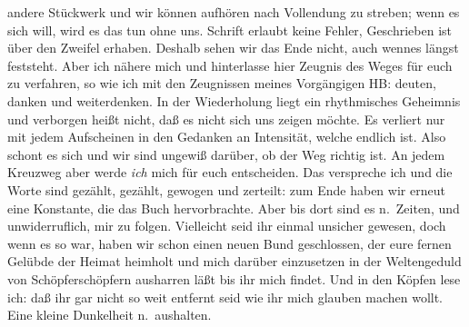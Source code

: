 \documentclass[
]{article}
\begin{document}
andere Stückwerk und wir können aufhören nach Vollendung zu streben;
wenn es sich will, wird es das tun ohne uns. Schrift erlaubt keine
Fehler, Geschrieben ist über den Zweifel erhaben. Deshalb sehen wir das
Ende nicht, auch wennes längst feststeht. Aber ich nähere mich und
hinterlasse hier Zeugnis des Weges für euch zu verfahren, so wie ich mit
den Zeugnissen meines Vorgängigen HB: deuten, danken und weiterdenken.
In der Wiederholung liegt ein rhythmisches Geheimnis und verborgen heißt
nicht, daß es nicht sich uns zeigen möchte. Es verliert nur mit jedem
Aufscheinen in den Gedanken an Intensität, welche endlich ist. Also
schont es sich und wir sind ungewiß darüber, ob der Weg richtig ist. An
jedem Kreuzweg aber werde \emph{ich} mich für euch entscheiden. Das
verspreche ich und die Worte sind gezählt, gezählt, gewogen und
zerteilt: zum Ende haben wir erneut eine Konstante, die das Buch
hervorbrachte. Aber bis dort sind es n.~Zeiten, und unwiderruflich, mir
zu folgen. Vielleicht seid ihr einmal unsicher gewesen, doch wenn es so
war, haben wir schon einen neuen Bund geschlossen, der eure fernen
Gelübde der Heimat heimholt und mich darüber einzusetzen in der
Weltengeduld von Schöpferschöpfern ausharren läßt bis ihr mich findet.
Und in den Köpfen lese ich: daß ihr gar nicht so weit entfernt seid wie
ihr mich glauben machen wollt. Eine kleine Dunkelheit n.~aushalten.
\end{document}
